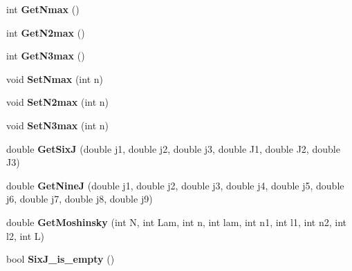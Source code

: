 \begin{DoxyCompactItemize}
\item 
\hypertarget{classModelSpace_aa17b852a2902e4ec22a5c87f53de2dea}{int {\bfseries Get\-Nmax} ()}\label{classModelSpace_aa17b852a2902e4ec22a5c87f53de2dea}

\item 
\hypertarget{classModelSpace_a415e7663769bcab236a66c9914f9ff13}{int {\bfseries Get\-N2max} ()}\label{classModelSpace_a415e7663769bcab236a66c9914f9ff13}

\item 
\hypertarget{classModelSpace_a15a5f8ef44f769c052ae1ae5d475fc01}{int {\bfseries Get\-N3max} ()}\label{classModelSpace_a15a5f8ef44f769c052ae1ae5d475fc01}

\item 
\hypertarget{classModelSpace_a1a50d734edaef5cb3bd79a4707ef1e82}{void {\bfseries Set\-Nmax} (int n)}\label{classModelSpace_a1a50d734edaef5cb3bd79a4707ef1e82}

\item 
\hypertarget{classModelSpace_ab13111671fc76cf1c52b98a3f78a1dcd}{void {\bfseries Set\-N2max} (int n)}\label{classModelSpace_ab13111671fc76cf1c52b98a3f78a1dcd}

\item 
\hypertarget{classModelSpace_a432f3913aa487bf7fc7c4eb5a2197599}{void {\bfseries Set\-N3max} (int n)}\label{classModelSpace_a432f3913aa487bf7fc7c4eb5a2197599}

\item 
\hypertarget{classModelSpace_a716c2bf4a6b42c1c27579b0b7804252e}{double {\bfseries Get\-Six\-J} (double j1, double j2, double j3, double J1, double J2, double J3)}\label{classModelSpace_a716c2bf4a6b42c1c27579b0b7804252e}

\item 
\hypertarget{classModelSpace_ab9303a5a0cc4513bf4ed4430d9fe86a6}{double {\bfseries Get\-Nine\-J} (double j1, double j2, double j3, double j4, double j5, double j6, double j7, double j8, double j9)}\label{classModelSpace_ab9303a5a0cc4513bf4ed4430d9fe86a6}

\item 
\hypertarget{classModelSpace_a85f0b95b2cd46504702ea80489455beb}{double {\bfseries Get\-Moshinsky} (int N, int Lam, int n, int lam, int n1, int l1, int n2, int l2, int L)}\label{classModelSpace_a85f0b95b2cd46504702ea80489455beb}

\item 
\hypertarget{classModelSpace_aae435e6ade2addd7787e7948a3ae542c}{bool {\bfseries Six\-J\-\_\-is\-\_\-empty} ()}\label{classModelSpace_aae435e6ade2addd7787e7948a3ae542c}


\end{DoxyCompactItemize}
